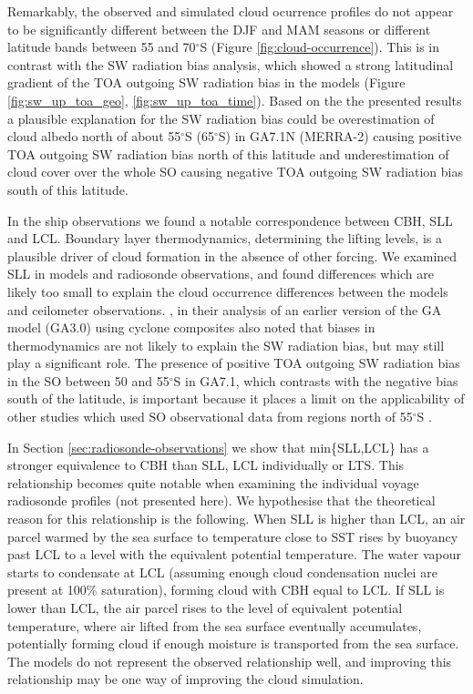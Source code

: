 Remarkably, the observed and simulated cloud ocurrence profiles do not appear
to be significantly different between the DJF and MAM seasons or different
latitude bands between 55 and 70$^\circ$S (Figure \ref{fig:cloud-occurrence}).
This is in contrast with the SW radiation bias analysis, which showed a strong
latitudinal gradient of the TOA outgoing SW radiation bias in the models
(Figure \ref{fig:sw_up_toa_geo}, \ref{fig:sw_up_toa_time}). Based on the the
presented results a plausible explanation for the SW radiation bias could be
overestimation of cloud albedo north of about 55$^\circ$S (65$^\circ$S) in
GA7.1N (MERRA-2) causing positive TOA outgoing SW radiation bias north of this
latitude and underestimation of cloud cover over the whole SO causing negative
TOA outgoing SW radiation bias south of this latitude.

In the ship observations we found a notable correspondence between CBH, SLL and
LCL. Boundary layer thermodynamics, determining the lifting levels, is a
plausible driver of cloud formation in the absence of other forcing. We
examined SLL in models and radiosonde observations, and found differences which
are likely too small to explain the cloud occurrence differences between the
models and ceilometer observations. \cite{bodas-salcedo2012}, in their analysis
of an earlier version of the GA model (GA3.0) using cyclone composites also
noted that biases in thermodynamics are not likely to explain the SW radiation
bias, but may still play a significant role. The presence of positive TOA
outgoing SW radiation bias in the SO between 50 and 55$^\circ$S in GA7.1, which
contrasts with the negative bias south of the latitude, is important because it
places a limit on the applicability of other studies which used SO
observational data from regions north of 55$^\circ$S \citep{lang2018}.

In Section \ref{sec:radiosonde-observations} we show that min\{SLL,LCL\} has a
stronger equivalence to CBH than SLL, LCL individually or LTS.  This
relationship becomes quite notable when examining the individual voyage
radiosonde profiles (not presented here). We hypothesise that the theoretical
reason for this relationship is the following. When SLL is higher than LCL, an
air parcel warmed by the sea surface to temperature close to SST rises by
buoyancy past LCL to a level with the equivalent potential temperature.  The
water vapour starts to condensate at LCL (assuming enough cloud condensation
nuclei are present at 100\% saturation), forming cloud with CBH equal to LCL.
If SLL is lower than LCL, the air parcel rises to the level of equivalent
potential temperature, where air lifted from the sea surface eventually
accumulates, potentially forming cloud if enough moisture is transported from
the sea surface. The models do not represent the observed relationship well,
and improving this relationship may be one way of improving the cloud
simulation.

